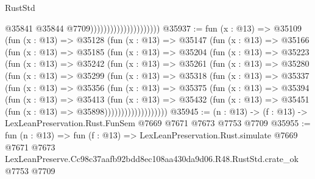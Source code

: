 \begin{lexlean}{RustStd}
\begin{coremodule}
                                              @35841
                                              @35844
                                              @7709)))))))))))))))))))))
@35937 := fun (x : @13) =>
  @35109
    (fun (x : @13) =>
    @35128
      (fun (x : @13) =>
      @35147
        (fun (x : @13) =>
        @35166
          (fun (x : @13) =>
          @35185
            (fun (x : @13) =>
            @35204
              (fun (x : @13) =>
              @35223
                (fun (x : @13) =>
                @35242
                  (fun (x : @13) =>
                  @35261
                    (fun (x : @13) =>
                    @35280
                      (fun (x : @13) =>
                      @35299
                        (fun (x : @13) =>
                        @35318
                          (fun (x : @13) =>
                          @35337
                            (fun (x : @13) =>
                            @35356
                              (fun (x : @13) =>
                              @35375
                                (fun (x : @13) =>
                                @35394
                                  (fun (x : @13) =>
                                  @35413
                                    (fun (x : @13) =>
                                    @35432
                                      (fun (x : @13) =>
                                      @35451 (fun (x : @13) => @35898)))))))))))))))))))
@35945 := (n : @13) -> (f : @13) -> LexLeanPreservation.Rust.FunSem @7669 @7671 @7673 @7753 @7709
@35955 := fun (n : @13) =>
  fun (f : @13) =>
  LexLeanPreservation.Rust.simulate
    @7669
    @7671
    @7673
    LexLeanPreserve.Cc98c37aafb92bdd8ec108aa430da9d06.R48.RustStd.crate_ok
    @7753
    @7709
\end{coremodule}
\end{lexlean}
